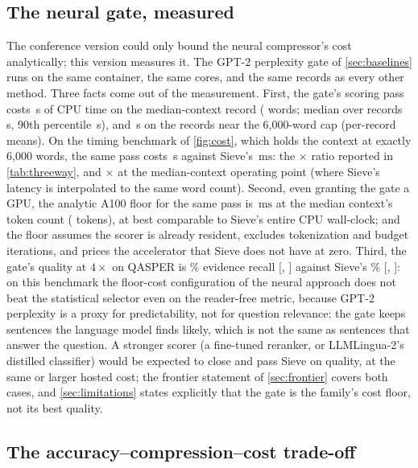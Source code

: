 \documentclass[pdflatex,sn-basic]{sn-jnl}
\theoremstyle{remark}
\newcommand{\method}{Sieve}
\newcommand{\ms}{\ensuremath{\mathrm{ms}}}
\begin{document}
\subsection{The neural gate, measured}
\label{sec:gate}
The conference version could only bound the neural compressor's cost
analytically; this version measures it. The GPT-2 perplexity gate of
\autoref{sec:baselines} runs on the same container, the same cores,
and the same records as every other method. Three facts come out of
the measurement. First, the gate's scoring pass costs
\GateLatMedCtxS\,s of CPU time on the median-context record
(\GateMedWords{} words; median over records \GateLatMedS\,s, 90th
percentile \GateLatPnineS\,s), and \GateLatSixkS\,s on the
\GateSixkN{} records near the 6{,}000-word cap (per-record means). On
the timing benchmark of \autoref{fig:cost}, which holds the context
at exactly 6{,}000 words, the same pass costs \GateLatBenchSixkS\,s
against \method{}'s \TimeSieSixk\,\ms{}: the
\GateSieRatioSixk$\times$ ratio reported in \autoref{tab:threeway},
and \GateSieRatioMed$\times$ at the median-context operating point
(where \method{}'s latency is interpolated to the same word count).
Second, even granting
the gate a GPU, the analytic A100 floor for the same pass is
\GateAOneFloorMs\,\ms{} at the median context's token count
(\GateMedTok{} tokens), at best comparable to \method{}'s entire CPU
wall-clock; and the floor assumes the scorer is already resident,
excludes tokenization and budget iterations, and prices the accelerator
that \method{} does not have at zero. Third, the gate's quality at
$4\times$ on QASPER is \GateRecall\% evidence recall
[\GateRecallLo, \GateRecallHi] against \method{}'s \RecQSie\%
[\RecQSieLo, \RecQSieHi]: on this benchmark the floor-cost
configuration of the neural approach does not beat the statistical
selector even on the reader-free metric, because GPT-2 perplexity is
a proxy for predictability, not for question relevance: the gate keeps
sentences the language model finds likely, which is not the same as
sentences that answer the question. A stronger scorer (a fine-tuned
reranker, or LLMLingua-2's distilled classifier) would be expected to
close and pass \method{} on quality, at the same or larger hosted
cost; the frontier statement of \autoref{sec:frontier} covers both
cases, and \autoref{sec:limitations} states explicitly that the gate
is the family's cost floor, not its best quality.

\subsection{The accuracy--compression--cost trade-off}
\label{sec:threeway}
\end{document}
